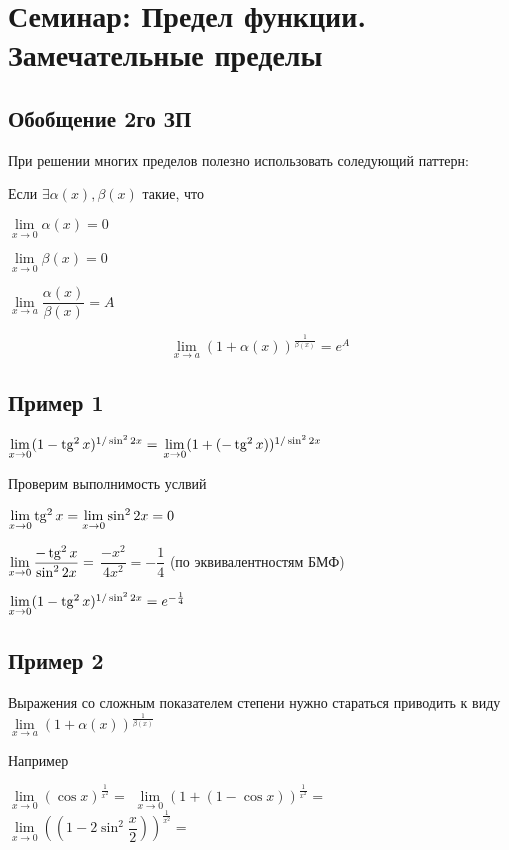 \section{Семинар: Предел функции. Замечательные пределы}

\subsection{Обобщение 2го ЗП}

При решении многих пределов полезно использовать соледующий паттерн:

Если $ \exists  \alpha(x), \beta(x) $ такие, что 

$ \lim\limits_{x \to 0 } \alpha(x) = 0 $

$ \lim\limits_{x \to 0 } \beta(x) = 0 $

$ \lim\limits_{x \to a } \dfrac{\alpha(x)}{\beta(x)} = A $

$$
\lim\limits_{x \to a } \left( 1 + \alpha(x)  \right )^{\frac{1}{\beta(x)}} = e^{A}
$$

\subsection{Пример 1}

$ \lim\limits_{x \to 0} (1 - \operatorname{tg}^{2}x)^{1/\sin^{2}2x}  = $
$ \lim\limits_{x \to 0} (1 + ( - \operatorname{tg}^{2}x ) )^{1/\sin^{2}2x}$

Проверим выполнимость услвий

$ \lim\limits_{x \to 0} \operatorname{tg}^{2}x = \lim\limits_{x \to 0} \sin^{2}2x  = 0$

$ \lim\limits_{x \to 0} \dfrac{- \operatorname{tg}^{2}x}{ \sin^{2}2x } = $
$ \dfrac{- x^{2}}{ 4x^{2} } = - \dfrac{1}{4}$
(по эквивалентностям БМФ)



$ \lim\limits_{x \to 0} (1 - \operatorname{tg}^{2}x)^{1/\sin^{2}2x}  = e^{-\frac{1}{4}}$

\subsection{Пример 2}

Выражения со сложным показателем степени нужно стараться приводить к виду
$ \lim\limits_{x \to a } \left( 1 + \alpha(x)  \right )^{\frac{1}{\beta(x)}} $

Например

$ \lim\limits_{x \to 0} (\cos x)^{\frac{1}{x^{2}}} = $
$ \lim\limits_{x \to 0} (1 + (1- \cos x))^{\frac{1}{x^{2}}} =$
$ \lim\limits_{x \to 0} ((1 - 2 \sin^{2} \dfrac{x}{2} ))^{\frac{1}{x^{2}}} = $


